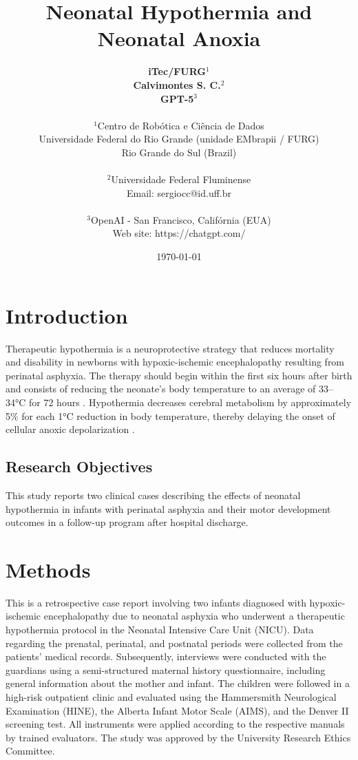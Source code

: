 \documentclass[11pt,a4paper]{article}
\title{\textbf{Neonatal Hypothermia and Neonatal Anoxia}}
\author{
	\textbf{iTec/FURG}$^{1}$ \\
	\textbf{Calvimontes S. C.}$^{2}$ \\
	\textbf{GPT-5}$^{3}$ \\
	\\
	\small $^{1}$Centro de Robótica e Ciência de Dados \\
	\small Universidade Federal do Rio Grande (unidade EMbrapii / FURG) \\
	\small Rio Grande do Sul (Brazil) \\
	\\
	\small $^{2}$Universidade Federal Fluminense \\
	\small Email: sergiocc@id.uff.br \\
	\\
	\small $^{3}$OpenAI - San Francisco, Califórnia (EUA) \\
	\small Web site: https://chatgpt.com/
}
\date{\today}
\begin{document}
	
	\maketitle
	
	\newpage
	
	\section{Introduction}
	
	Therapeutic hypothermia is a neuroprotective strategy that reduces mortality and disability in newborns with hypoxic-ischemic encephalopathy resulting from perinatal asphyxia. The therapy should begin within the first six hours after birth and consists of reducing the neonate’s body temperature to an average of 33–34°C for 72 hours \cite{Azzopardi2014,Thayyil2021,Abate2021}. Hypothermia decreases cerebral metabolism by approximately 5\% for each 1°C reduction in body temperature, thereby delaying the onset of cellular anoxic depolarization \cite{Silveira2015}.
		
	\subsection{Research Objectives}
	This study reports two clinical cases describing the effects of neonatal hypothermia in infants with perinatal asphyxia and their motor development outcomes in a follow-up program after hospital discharge.
	
	\section{Methods}
	This is a retrospective case report involving two infants diagnosed with hypoxic-ischemic encephalopathy due to neonatal asphyxia who underwent a therapeutic hypothermia protocol in the Neonatal Intensive Care Unit (NICU). Data regarding the prenatal, perinatal, and postnatal periods were collected from the patients’ medical records. Subsequently, interviews were conducted with the guardians using a semi-structured maternal history questionnaire, including general information about the mother and infant.
	The children were followed in a high-risk outpatient clinic and evaluated using the Hammersmith Neurological Examination (HINE), the Alberta Infant Motor Scale (AIMS), and the Denver II screening test. All instruments were applied according to the respective manuals by trained evaluators. The study was approved by the University Research Ethics Committee.
	
\end{document}
